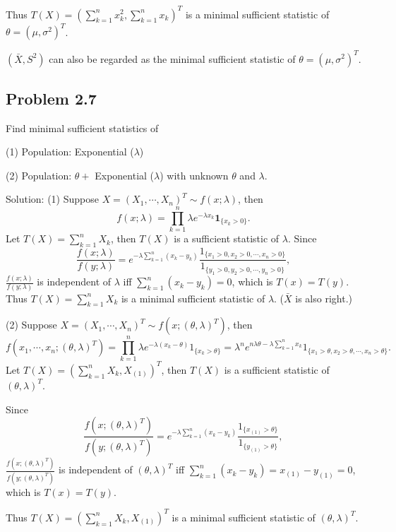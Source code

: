Thus $T(X)=\left(\sum_{k=1}^{n}x_{k}^{2},\sum_{k=1}^{n}x_{k}\right)^{T}$ is a minimal sufficient statistic of $\theta=\left(\mu,\sigma^{2}\right)^{T}$.

$(\bar{X},S^{2})$ can also be regarded as the minimal sufficient statistic of $\theta=\left(\mu,\sigma^{2}\right)^{T}$.

\subsection*{Problem 2.7}
Find minimal sufficient statistics of

(1) Population: Exponential ($\lambda$)

(2) Population: $\theta+$ Exponential ($\lambda$) with unknown $\theta$ and $\lambda$.

{Solution:}
(1) Suppose $X=(X_{1},\cdots,X_{n})^{T}\sim f(x;\lambda)$, then
\[
f(x;\lambda)=\prod_{k=1}^{n}\lambda e^{-\lambda x_{k}}\mathbf{1}_{\{x_{k}>0\}}.
\]
Let $T(X)=\sum_{k=1}^{n}X_{k}$, then $T(X)$ is a sufficient statistic of $\lambda$. Since
\[\frac{f(x;\lambda)}{f(y;\lambda)}=e^{-\lambda\sum_{k=1}^{n}(x_{k}-y_{k})}\frac{1_{\{x_{1}>0,x_{2}>0,\cdots,x_{n}>0\}}}{1_{\{y_{1}>0,y_{2}>0,\cdots,y_{n}>0\}}},\]
$\frac{f(x;\lambda)}{f(y;\lambda)}$ is independent of $\lambda$ iff $\sum_{k=1}^{n}(x_{k}-y_{k})=0$, which is $T(x)=T(y)$. Thus $T(X)=\sum_{k=1}^{n}X_{k}$ is a minimal sufficient statistic of $\lambda$. ($\bar{X}$ is also right.)

(2) Suppose $X=(X_{1},\cdots,X_{n})^{T}\sim f\left(x;(\theta,\lambda)^{T}\right)$, then
\[
f\left(x_{1},\cdots,x_{n};(\theta,\lambda)^{T}\right)=\prod_{k=1}^{n}\lambda e^{-\lambda(x_{k}-\theta)}1_{\{x_{k}>\theta\}}=\lambda^{n}e^{n\lambda\theta-\lambda\sum_{k=1}^{n}x_{k}}1_{\{x_{1}>\theta,x_{2}>\theta,\cdots,x_{n}>\theta\}}.
\]
Let $T(X)=\left(\sum_{k=1}^{n}X_{k},X_{(1)}\right)^{T}$, then $T(X)$ is a sufficient statistic of $(\theta,\lambda)^{T}$.

Since \[\frac{f\left(x;(\theta,\lambda)^{T}\right)}{f\left(y;(\theta,\lambda)^{T}\right)}=e^{-\lambda\sum_{k=1}^{n}(x_{k}-y_{k})}\frac{1_{\{x_{(1)}>\theta\}}}{1_{\{y_{(1)}>\theta\}}},\]
$\frac{f\left(x;(\theta,\lambda)^{T}\right)}{f\left(y;(\theta,\lambda)^{T}\right)}$ is independent of $(\theta,\lambda)^{T}$ iff $\sum_{k=1}^{n}\left(x_{k}-y_{k}\right)=x_{(1)}-y_{(1)}=0$, which is $T(x)=T(y)$.

Thus $T(X)=\left(\sum_{k=1}^{n}X_{k},X_{(1)}\right)^{T}$ is a minimal sufficient statistic of $(\theta,\lambda)^{T}$.

